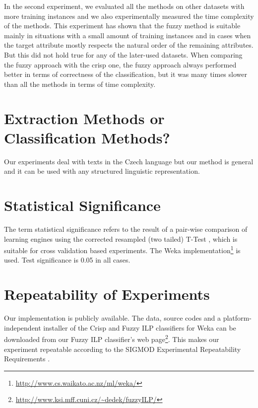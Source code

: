 In the second experiment, we evaluated all the methods on other datasets with more training instances and we also experimentally measured the time complexity of the methods. This experiment has shown that the fuzzy method is suitable mainly in situations with a small amount of training instances and in cases when the target attribute mostly respects the natural order of the remaining attributes. But this did not hold true for any of the later-used datasets. When comparing the fuzzy approach with the crisp one, the fuzzy approach always performed better in terms of correctness of the classification, but it was many times slower than all the methods in terms of time complexity.






\section{Extraction Methods or Classification Methods?}


Our experiments deal with texts in the Czech language but our method is general and it can be used with any structured linguistic representation. 

\section{Statistical Significance} \label{sec:conclusion_statsig}
The term statistical significance refers to the result of a pair-wise comparison of learning engines using the corrected resampled (two tailed) T-Test \citep{Nadeau:2003:IGE:779909.779927}, which is suitable for cross validation based experiments. The Weka implementation\footnote{\url{http://www.cs.waikato.ac.nz/ml/weka/}} is used. Test significance is 0.05 in all cases.


\section{Repeatability of Experiments} \label{sec:conclusion_repeatablity}


Our implementation is publicly available. The data, source codes and a platform-independent installer of the Crisp and Fuzzy ILP classifiers for Weka can be downloaded from our Fuzzy ILP classifier's web page\footnote{\url{http://www.ksi.mff.cuni.cz/~dedek/fuzzyILP/}}. This makes our experiment repeatable according to the
SIGMOD Experimental Repeatability Requirements \citep{biblio:SIGMODrepeatability}.



